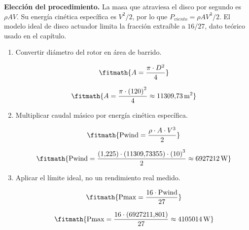 \noindent\textbf{Elección del procedimiento.} La masa que atraviesa el disco por segundo es $\rho AV$. Su energía cinética específica es $V^2/2$, por lo que $P_{viento}=\rho AV^3/2$. El modelo ideal de disco actuador limita la fracción extraíble a $16/27$, dato teórico usado en el capítulo.

\begin{enumerate}

\item Convertir diámetro del rotor en área de barrido.

\[\fitmath{A=\frac{\pi\cdot {D}^{2}}{4}}\]

\[\fitmath{A=\frac{\pi\cdot {(120)}^{2}}{4}\approx 11309{,}73\,\mathrm{m^{2}}}\]

\item Multiplicar caudal másico por energía cinética específica.

\[\fitmath{\mathrm{Pwind}=\frac{\rho\cdot A\cdot {V}^{3}}{2}}\]

\[\fitmath{\mathrm{Pwind}=\frac{(1{,}225)\cdot (11309{,}73355)\cdot {(10)}^{3}}{2}\approx 6927212\,\mathrm{W}}\]

\item Aplicar el límite ideal, no un rendimiento real medido.

\[\fitmath{\mathrm{Pmax}=\frac{16\cdot \mathrm{Pwind}}{27}}\]

\[\fitmath{\mathrm{Pmax}=\frac{16\cdot (6927211{,}801)}{27}\approx 4105014\,\mathrm{W}}\]

\end{enumerate}
